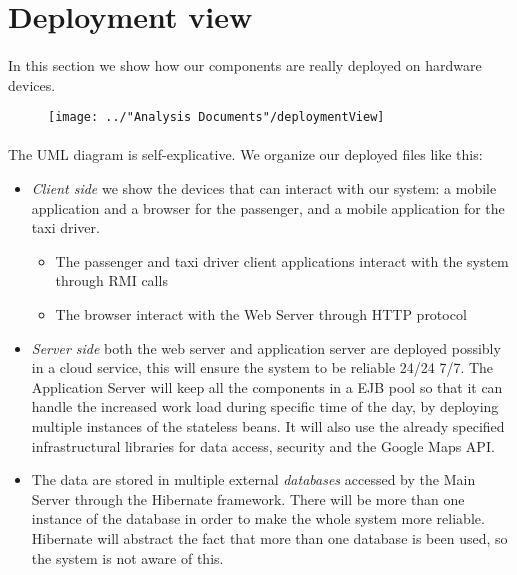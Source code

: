 \section{Deployment view}
\paragraph{}In this section we show how our components are really deployed on hardware devices.
\begin{figure}[H]
	\centering
	\texttt{[image: ../"Analysis Documents"/deploymentView]}
\end{figure}
\paragraph{} The UML diagram is self-explicative. We organize our deployed files like this:
\begin{itemize}
	\item \textit{Client side} we show the devices that can interact with our system: a mobile application and a browser for the passenger, and a mobile application for the taxi driver.
	\begin{itemize}
		\item The passenger and taxi driver client applications interact with the system through RMI calls
		\item The browser interact with the Web Server through HTTP protocol
	\end{itemize}
	\item \textit{Server side} both the web server and application server are deployed possibly in a cloud service, this will ensure the system to be reliable 24/24 7/7. The Application Server will keep all the components in a EJB pool so that it can handle the increased work load during specific time of the day, by deploying multiple instances of the stateless beans. It will also use the already specified infrastructural libraries for data access, security and the Google Maps API.
	\item The data are stored in multiple external \textit{databases} accessed by the Main Server through the Hibernate framework. There will be more than one instance of the database in order to make the whole system more reliable. Hibernate will abstract the fact that more than one database is been used, so the system is not aware of this.
\end{itemize}